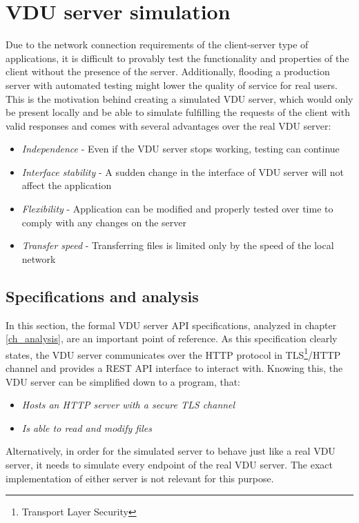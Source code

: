 \section{VDU server simulation}
Due to the network connection requirements of the client-server type of applications, it is difficult to provably test the functionality and properties of the client without the presence of the server. Additionally, flooding a production server with automated testing might lower the quality of service for real users. This is the motivation behind creating a simulated VDU server, which would only be present locally and be able to simulate fulfilling the requests of the client with valid responses and comes with several advantages over the real VDU server:
\begin{itemize}
    \item \textit{Independence} - Even if the VDU server stops working, testing can continue
    \item \textit{Interface stability} - A sudden change in the interface of VDU server will not affect the application
    \item \textit{Flexibility} - Application can be modified and properly tested over time to comply with any changes on the server
    \item \textit{Transfer speed} - Transferring files is limited only by the speed of the local network
\end{itemize}

\subsection{Specifications and analysis}
In this section, the formal VDU server API specifications, analyzed in chapter \ref{ch_analysis}, are an important point of reference. As this specification clearly states, the VDU server communicates over the HTTP protocol in TLS\footnote{Transport Layer Security}/HTTP channel and provides a REST API interface to interact with. Knowing this, the VDU server can be simplified down to a program, that:
\begin{itemize}
    \item \textit{Hosts an HTTP server with a secure TLS channel}
    \item \textit{Is able to read and modify files}
\end{itemize}
Alternatively, in order for the simulated server to behave just like a real VDU server, it needs to simulate every endpoint of the real VDU server. The exact implementation of either server is not relevant for this purpose.

